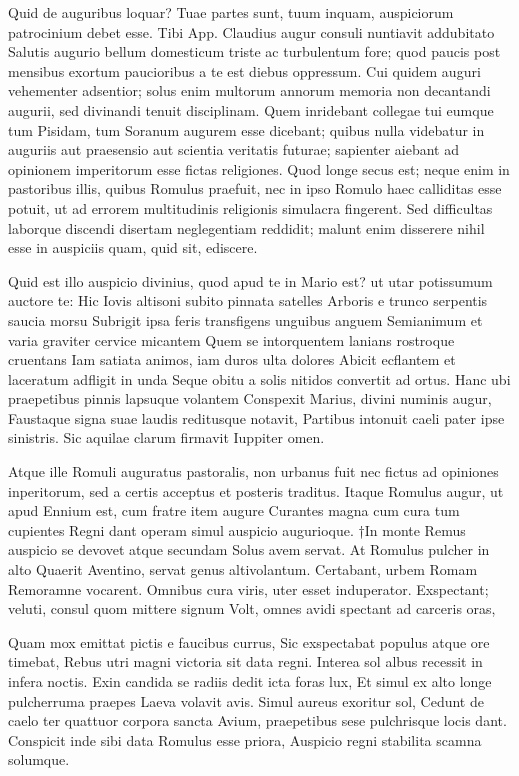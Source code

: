  Quid de auguribus loquar? Tuae partes sunt, tuum inquam, auspiciorum patrocinium debet esse. Tibi App. Claudius augur consuli nuntiavit addubitato Salutis augurio bellum domesticum triste ac turbulentum fore; quod paucis post mensibus exortum paucioribus a te est diebus oppressum. Cui quidem auguri vehementer adsentior; solus enim multorum annorum memoria non decantandi augurii, sed divinandi tenuit disciplinam. Quem inridebant collegae tui eumque tum Pisidam, tum Soranum augurem esse dicebant; quibus nulla videbatur in auguriis aut praesensio aut scientia veritatis futurae; sapienter aiebant ad opinionem imperitorum esse fictas religiones. Quod longe secus est; neque enim in pastoribus illis, quibus Romulus praefuit, nec in ipso Romulo haec calliditas esse potuit, ut ad errorem multitudinis religionis simulacra fingerent. Sed difficultas laborque discendi disertam neglegentiam reddidit; malunt enim disserere nihil esse in auspiciis quam, quid sit, ediscere.

 Quid est illo auspicio divinius, quod apud te in Mario est? ut utar potissumum auctore te: Hic Iovis altisoni subito pinnata satelles Arboris e trunco serpentis saucia morsu Subrigit ipsa feris transfigens unguibus anguem Semianimum et varia graviter cervice micantem Quem se intorquentem lanians rostroque cruentans Iam satiata animos, iam duros ulta dolores Abicit ecflantem et laceratum adfligit in unda Seque obitu a solis nitidos convertit ad ortus. Hanc ubi praepetibus pinnis lapsuque volantem Conspexit Marius, divini numinis augur, Faustaque signa suae laudis reditusque notavit, Partibus intonuit caeli pater ipse sinistris. Sic aquilae clarum firmavit Iuppiter omen.

 Atque ille Romuli auguratus pastoralis, non urbanus fuit nec fictus ad opiniones inperitorum, sed a certis acceptus et posteris traditus. Itaque Romulus augur, ut apud Ennium est, cum fratre item augure Curantes magna cum cura tum cupientes Regni dant operam simul auspicio augurioque. †In monte Remus auspicio se devovet atque secundam Solus avem servat. At Romulus pulcher in alto Quaerit Aventino, servat genus altivolantum. Certabant, urbem Romam Remoramne vocarent. Omnibus cura viris, uter esset induperator. Exspectant; veluti, consul quom mittere signum Volt, omnes avidi spectant ad carceris oras,

 Quam mox emittat pictis e faucibus currus, Sic exspectabat populus atque ore timebat, Rebus utri magni victoria sit data regni. Interea sol albus recessit in infera noctis. Exin candida se radiis dedit icta foras lux, Et simul ex alto longe pulcherruma praepes Laeva volavit avis. Simul aureus exoritur sol, Cedunt de caelo ter quattuor corpora sancta Avium, praepetibus sese pulchrisque locis dant. Conspicit inde sibi data Romulus esse priora, Auspicio regni stabilita scamna solumque.

